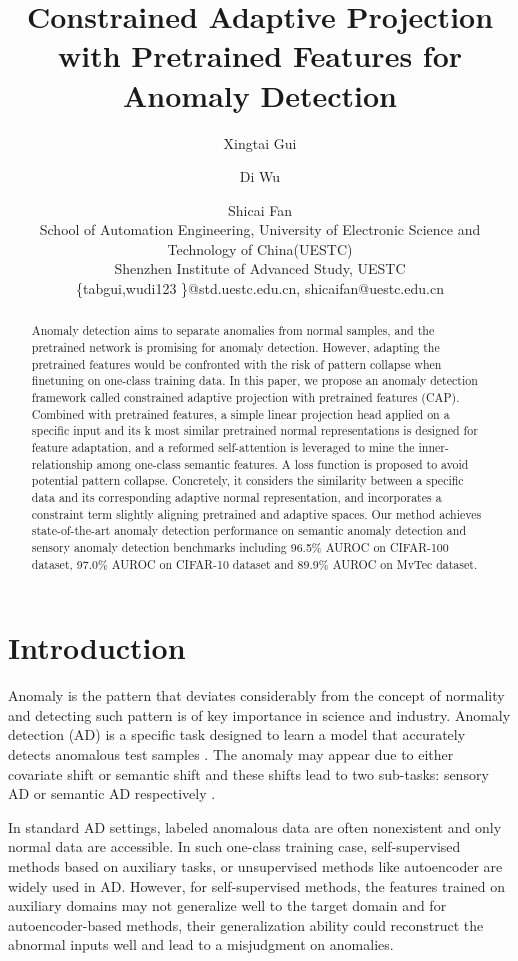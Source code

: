 \documentclass{article}
\title{Constrained Adaptive Projection with Pretrained Features for Anomaly Detection}
\author{
Xingtai Gui
\and
Di Wu
\and
Shicai Fan\\
\affiliations
School of Automation Engineering, University of Electronic Science and Technology of China(UESTC)\\
Shenzhen Institute of Advanced Study, UESTC\\
\emails
\{tabgui,wudi123 \}@std.uestc.edu.cn,
shicaifan@uestc.edu.cn
}
\begin{document}
\maketitle

\begin{abstract}
Anomaly detection aims to separate anomalies from normal samples, and the pretrained network is promising for anomaly detection. However, adapting the pretrained features would be confronted with the risk of pattern collapse when finetuning on one-class training data. In this paper, we propose an anomaly detection framework called constrained adaptive projection with pretrained features (CAP). Combined with pretrained features, a simple linear projection head applied on a specific input and its k most similar pretrained normal representations is designed for feature adaptation, and a reformed self-attention is leveraged to mine the inner-relationship among one-class semantic features. A loss function is proposed to avoid potential pattern collapse. Concretely, it considers the similarity between a specific data and its corresponding adaptive normal representation, and incorporates a constraint term slightly aligning pretrained and adaptive spaces. Our method achieves state-of-the-art anomaly detection performance on semantic anomaly detection and sensory anomaly detection benchmarks including 96.5\% AUROC on CIFAR-100 dataset, 97.0\% AUROC on CIFAR-10 dataset and 89.9\% AUROC on MvTec dataset.

\end{abstract}


\section{Introduction}
Anomaly is the pattern that deviates considerably from the concept of normality and detecting such pattern is of key importance in science and industry. Anomaly detection (AD) is a specific task designed to learn a model that accurately detects anomalous test samples \cite{review}. The anomaly may appear due to either covariate shift or semantic shift and these shifts lead to two sub-tasks: sensory AD or semantic AD respectively \cite{review2}.  


In standard AD settings, labeled anomalous data are often nonexistent and only normal data are accessible. In such one-class training case, self-supervised methods based on auxiliary tasks, or unsupervised methods like autoencoder are widely used in AD. However, for self-supervised methods, the features trained on auxiliary domains may not generalize well to the target domain and for autoencoder-based methods, their generalization ability could reconstruct the abnormal inputs well and lead to a misjudgment on anomalies. 
\end{document}
